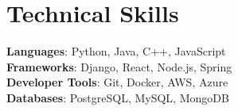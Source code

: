 \documentclass[letterpaper,11pt]{article}
\begin{document}
\section{Technical Skills} %
\begin{itemize}[leftmargin=0.15in, label={}]
\small{\item{\textbf{Languages}{: Python, Java, C++, JavaScript} \\
\textbf{Frameworks}{: Django, React, Node.js, Spring} \\
\textbf{Developer Tools}{: Git, Docker, AWS, Azure} \\
\textbf{Databases}{: PostgreSQL, MySQL, MongoDB} }}
\end{itemize}


\end{document}
